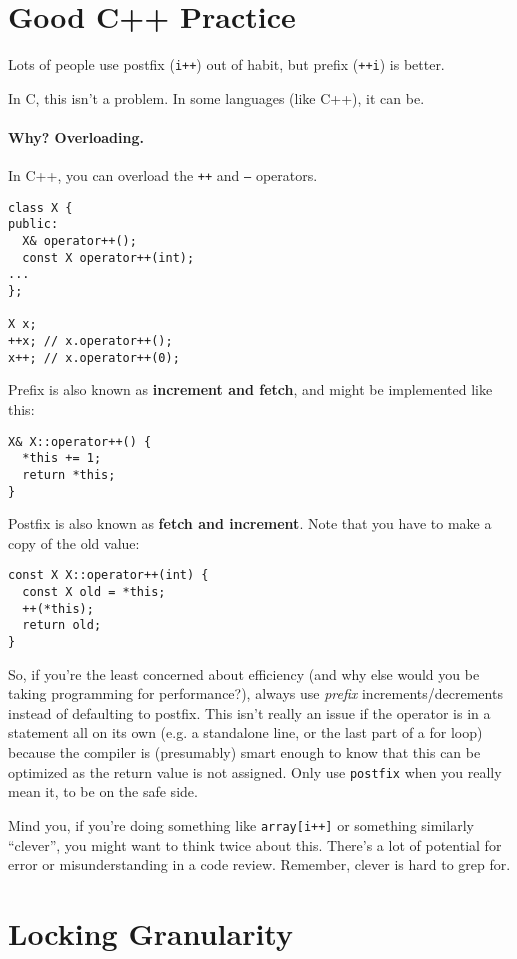 \section*{Good C++ Practice}
Lots of people use postfix ({\tt i++}) out of habit, but prefix ({\tt ++i}) is better.

In C, this isn't a problem. 
In some languages (like C++), it can be.

\paragraph{Why? Overloading.} In C++, you can overload the {\tt ++} and {\tt --} operators.

  \begin{verbatim}
class X {
public:
  X& operator++();
  const X operator++(int);
...
};

X x;
++x; // x.operator++();
x++; // x.operator++(0);
  \end{verbatim}

Prefix is also known as {\bf increment and fetch}, and might be implemented like this:
  \begin{verbatim}
X& X::operator++() {
  *this += 1;
  return *this;
}
  \end{verbatim}

  Postfix is also known as {\bf fetch and increment}. Note that you have to make a copy of
the old value:
  \begin{verbatim}
const X X::operator++(int) {
  const X old = *this;
  ++(*this);
  return old;
}
  \end{verbatim}

So, if you're the least concerned about efficiency (and why else would you be
taking programming for performance?), always use
  \emph{prefix} increments/decrements instead of defaulting to postfix. This isn't really an issue if the operator is in a statement all on its own (e.g. a standalone line, or the last part of a for loop) because the compiler is (presumably) smart enough to know that this can be optimized as the return value is not assigned. Only use {\tt postfix} when you really mean it, to be on the safe side.
  
Mind you, if you're doing something like \texttt{array[i++]} or something similarly ``clever'', you might want to think twice about this. There's a lot of potential for error or misunderstanding in a code review. Remember, clever is hard to grep for.

\section*{Locking Granularity}

